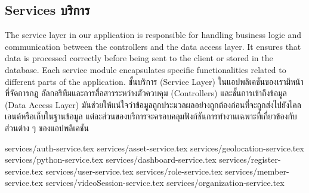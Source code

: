 \subsection{\ifenglish Services \else บริการ \fi}

\ifenglish
The service layer in our application is responsible for handling business logic and communication between the controllers and the data access layer. It ensures that data is processed correctly before being sent to the client or stored in the database. Each service module encapsulates specific functionalities related to different parts of the application.
\else
ชั้นบริการ (Service Layer) ในแอปพลิเคชันของเรามีหน้าที่จัดการกฎ อัลกอริทึมและการสื่อสารระหว่างตัวควบคุม (Controllers) และชั้นการเข้าถึงข้อมูล (Data Access Layer) มันช่วยให้แน่ใจว่าข้อมูลถูกประมวลผลอย่างถูกต้องก่อนที่จะถูกส่งไปยังไคลเอนต์หรือเก็บในฐานข้อมูล แต่ละส่วนของบริการจะครอบคลุมฟังก์ชันการทำงานเฉพาะที่เกี่ยวข้องกับส่วนต่าง ๆ ของแอปพลิเคชัน
\fi


{services/auth-service.tex}
{services/asset-service.tex}
{services/geolocation-service.tex}
{services/python-service.tex}
{services/dashboard-service.tex}
{services/register-service.tex}
{services/user-service.tex}
{services/role-service.tex}
{services/member-service.tex}
{services/videoSession-service.tex}
{services/organization-service.tex}